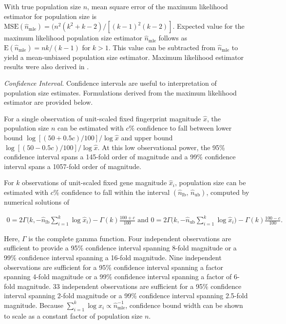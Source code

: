 With true population size $n$, mean square error of the maximum likelihood estimator for population size is $\mathrm{MSE}(\hat{n}_\mathrm{mle}) = (n^2 (k^{2}+ k-2) / [(k-1)^{2}(k-2)]$.
Expected value for the maximum likelihood population size estimator $\hat{n}_\mathrm{mle}$ follows as $\mathrm{E}(\hat{n}_\mathrm{mle}) = nk/(k-1)$ for $k>1$.
This value can be subtracted from $\hat{n}_\mathrm{mle}$ to yield a mean-unbiased population size estimator.
Maximum likelihood estimator results were also derived in \citep{varagnolo2010distributed}.

\textit{Confidence Interval.}
Confidence intervals are useful to interpretation of population size estimates.
Formulations derived from the maximum likelihood estimator are provided below.

For a single observation of unit-scaled fixed fingerprint magnitude $\hat{x}$, the population size $n$ can be estimated with $c\%$ confidence to fall between lower bound $\log[(50+0.5c)/100] / \log\hat{x}$ and upper bound $\log[(50-0.5c)/100] / \log\hat{x}$.
At this low observational power, the 95\% confidence interval spans a 145-fold order of magnitude and a 99\% confidence interval spans a 1057-fold order of magnitude.

For $k$ observations of unit-scaled fixed gene magnitude $\hat{x}_i$, population size can be estimated with $c\%$ confidence to fall within the interval $(\hat{n}_\mathrm{lb}, \, \hat{n}_\mathrm{ub})$, computed by numerical solutions of

\begin{footnotesize}
\begin{align}
0
= 2\Gamma\Big(k, -\hat{n}_\mathrm{lb}\sum_{i=1}^k \log\hat{x}_i\Big) - \Gamma(k)\frac{100+c}{100} \text{ and }
0
= 2\Gamma\Big(k, -\hat{n}_\mathrm{ub}\sum_{i=1}^k \log\hat{x}_i\Big) - \Gamma(k)\frac{100-c}{100}.  \label{eqn:popsize_mle_ci}
\end{align}
\end{footnotesize}

Here, $\Gamma$ is the complete gamma function.
Four independent observations are sufficient to provide a 95\% confidence interval spanning 8-fold magnitude or a 99\% confidence interval spanning a 16-fold magnitude.
Nine independent observations are sufficient for a 95\% confidence interval spanning a factor spanning 4-fold magnitude or a 99\% confidence interval spanning a factor of 6-fold magnitude.
33 independent observations are sufficient for a 95\% confidence interval spanning 2-fold magnitude or a 99\% confidence interval spanning 2.5-fold magnitude.
Because $\sum_{i=1}^k \log\hat{x}_i \propto \hat{n}_\mathrm{mle}^{-1}$, confidence bound width can be shown to scale as a constant factor of population size $n$.


